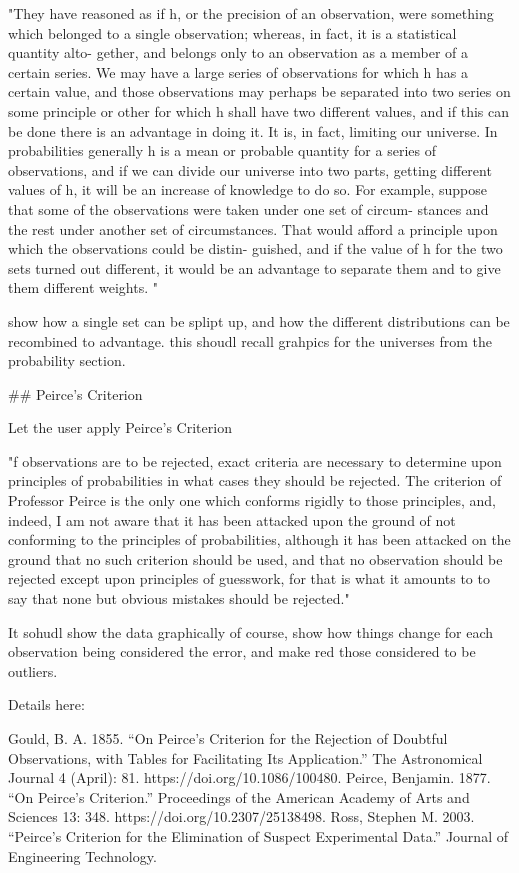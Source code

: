 "They have reasoned as if h, or the precision of an observation, were something which belonged to a single observation; whereas, in fact, it is a statistical quantity alto- gether, and belongs only to an observation as a member of a certain series. We may have a large series of observations for which h has a certain value, and those observations may perhaps be separated into two series on some principle or other for which h shall have two different values, and if this can be done there is an advantage in doing it. It is, in fact, limiting our universe. In probabilities generally h is a mean or probable quantity for a series of observations, and if we can divide our universe into two parts, getting different values of h, it will be an increase of knowledge to do so. For example, suppose that some of the observations were taken under one set of circum- stances and the rest under another set of circumstances. That would afford a principle upon which the observations could be distin- guished, and if the value of h for the two sets turned out different, it would be an advantage to separate them and to give them different weights. "

show how a single set can be splipt up, and how the different distributions can be recombined to advantage. this shoudl recall grahpics for the universes from the probability section. 



## Peirce's Criterion

Let the user apply Peirce's Criterion

"f observations are to be rejected, exact criteria are necessary to determine upon principles of probabilities in what cases they should be rejected. The criterion of Professor Peirce is the only one which conforms rigidly to those principles, and, indeed, I am not aware that it has been attacked upon the ground of not conforming to the principles of probabilities, although it has been attacked on the ground that no such criterion should be used, and that no observation should be rejected except upon principles of guesswork, for that is what it amounts to to say that none but obvious mistakes should be rejected."

It sohudl show the data graphically of course, show how things change for each observation being considered the error, and make red those considered to be outliers. 

Details here: 

Gould, B. A. 1855. “On Peirce’s Criterion for the Rejection of Doubtful Observations, with Tables for Facilitating Its Application.” The Astronomical Journal 4 (April): 81. https://doi.org/10.1086/100480.
Peirce, Benjamin. 1877. “On Peirce’s Criterion.” Proceedings of the American Academy of Arts and Sciences 13: 348. https://doi.org/10.2307/25138498.
Ross, Stephen M. 2003. “Peirce’s Criterion for the Elimination of Suspect Experimental Data.” Journal of Engineering Technology.


